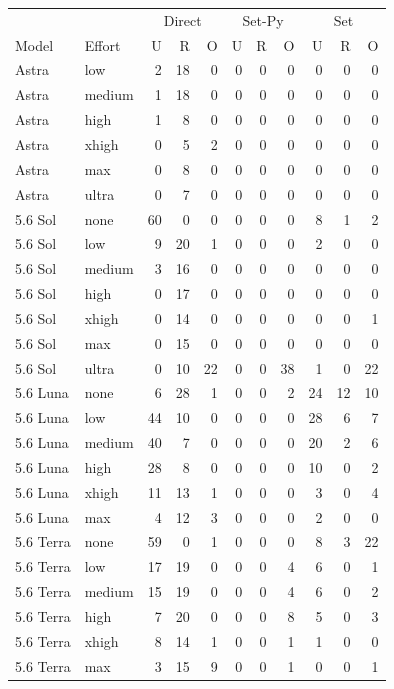 \begin{tabular}{llrrrrrrrrr}
\toprule
&&\multicolumn{3}{c}{Direct} & \multicolumn{3}{c}{Set-Py} & \multicolumn{3}{c}{Set} \\
Model & Effort & U & R & O & U & R & O & U & R & O \\
\midrule
Astra & low & 2 & 18 & 0 & 0 & 0 & 0 & 0 & 0 & 0 \\
Astra & medium & 1 & 18 & 0 & 0 & 0 & 0 & 0 & 0 & 0 \\
Astra & high & 1 & 8 & 0 & 0 & 0 & 0 & 0 & 0 & 0 \\
Astra & xhigh & 0 & 5 & 2 & 0 & 0 & 0 & 0 & 0 & 0 \\
Astra & max & 0 & 8 & 0 & 0 & 0 & 0 & 0 & 0 & 0 \\
Astra & ultra & 0 & 7 & 0 & 0 & 0 & 0 & 0 & 0 & 0 \\
\midrule
5.6 Sol & none & 60 & 0 & 0 & 0 & 0 & 0 & 8 & 1 & 2 \\
5.6 Sol & low & 9 & 20 & 1 & 0 & 0 & 0 & 2 & 0 & 0 \\
5.6 Sol & medium & 3 & 16 & 0 & 0 & 0 & 0 & 0 & 0 & 0 \\
5.6 Sol & high & 0 & 17 & 0 & 0 & 0 & 0 & 0 & 0 & 0 \\
5.6 Sol & xhigh & 0 & 14 & 0 & 0 & 0 & 0 & 0 & 0 & 1 \\
5.6 Sol & max & 0 & 15 & 0 & 0 & 0 & 0 & 0 & 0 & 0 \\
5.6 Sol & ultra & 0 & 10 & 22 & 0 & 0 & 38 & 1 & 0 & 22 \\
\midrule
5.6 Luna & none & 6 & 28 & 1 & 0 & 0 & 2 & 24 & 12 & 10 \\
5.6 Luna & low & 44 & 10 & 0 & 0 & 0 & 0 & 28 & 6 & 7 \\
5.6 Luna & medium & 40 & 7 & 0 & 0 & 0 & 0 & 20 & 2 & 6 \\
5.6 Luna & high & 28 & 8 & 0 & 0 & 0 & 0 & 10 & 0 & 2 \\
5.6 Luna & xhigh & 11 & 13 & 1 & 0 & 0 & 0 & 3 & 0 & 4 \\
5.6 Luna & max & 4 & 12 & 3 & 0 & 0 & 0 & 2 & 0 & 0 \\
\midrule
5.6 Terra & none & 59 & 0 & 1 & 0 & 0 & 0 & 8 & 3 & 22 \\
5.6 Terra & low & 17 & 19 & 0 & 0 & 0 & 4 & 6 & 0 & 1 \\
5.6 Terra & medium & 15 & 19 & 0 & 0 & 0 & 4 & 6 & 0 & 2 \\
5.6 Terra & high & 7 & 20 & 0 & 0 & 0 & 8 & 5 & 0 & 3 \\
5.6 Terra & xhigh & 8 & 14 & 1 & 0 & 0 & 1 & 1 & 0 & 0 \\
5.6 Terra & max & 3 & 15 & 9 & 0 & 0 & 1 & 0 & 0 & 1 \\
\bottomrule
\end{tabular}
